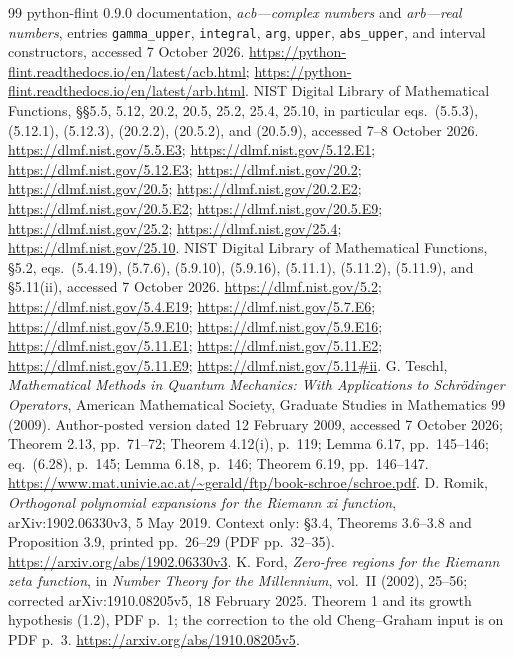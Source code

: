 \documentclass[11pt]{article}
\theoremstyle{remark}\newtheorem{remark}[theorem]{Remark}
\begin{document}
\begin{thebibliography}{99}
 python-flint 0.9.0 documentation,
\emph{acb---complex numbers} and \emph{arb---real numbers},
entries \texttt{gamma\_upper}, \texttt{integral}, \texttt{arg},
\texttt{upper}, \texttt{abs\_upper}, and interval constructors,
accessed 7 October 2026.
\url{https://python-flint.readthedocs.io/en/latest/acb.html};
\url{https://python-flint.readthedocs.io/en/latest/arb.html}.
 NIST Digital Library of Mathematical Functions,
\S\S5.5, 5.12, 20.2, 20.5, 25.2, 25.4, 25.10,
in particular eqs.~(5.5.3), (5.12.1), (5.12.3), (20.2.2), (20.5.2),
and (20.5.9), accessed 7--8 October 2026.
\url{https://dlmf.nist.gov/5.5.E3};
\url{https://dlmf.nist.gov/5.12.E1};
\url{https://dlmf.nist.gov/5.12.E3};
\url{https://dlmf.nist.gov/20.2}; \url{https://dlmf.nist.gov/20.5};
\url{https://dlmf.nist.gov/20.2.E2};
\url{https://dlmf.nist.gov/20.5.E2};
\url{https://dlmf.nist.gov/20.5.E9};
\url{https://dlmf.nist.gov/25.2}; \url{https://dlmf.nist.gov/25.4};
\url{https://dlmf.nist.gov/25.10}.
 NIST Digital Library of Mathematical Functions,
\S5.2, eqs.~(5.4.19), (5.7.6), (5.9.10), (5.9.16),
(5.11.1), (5.11.2), (5.11.9),
and \S5.11(ii),
accessed 7 October 2026.
\url{https://dlmf.nist.gov/5.2};
\url{https://dlmf.nist.gov/5.4.E19};
\url{https://dlmf.nist.gov/5.7.E6};
\url{https://dlmf.nist.gov/5.9.E10};
\url{https://dlmf.nist.gov/5.9.E16};
\url{https://dlmf.nist.gov/5.11.E1};
\url{https://dlmf.nist.gov/5.11.E2};
\url{https://dlmf.nist.gov/5.11.E9}; \url{https://dlmf.nist.gov/5.11#ii}.
 G. Teschl,
\emph{Mathematical Methods in Quantum Mechanics: With Applications
to Schr\"odinger Operators}, American Mathematical Society,
Graduate Studies in Mathematics 99 (2009).
Author-posted version dated 12 February 2009, accessed 7 October 2026;
Theorem 2.13, pp.~71--72; Theorem 4.12(i), p.~119;
Lemma 6.17, pp.~145--146; eq.~(6.28), p.~145;
Lemma 6.18, p.~146; Theorem 6.19, pp.~146--147.
\url{https://www.mat.univie.ac.at/~gerald/ftp/book-schroe/schroe.pdf}.
 D. Romik,
\emph{Orthogonal polynomial expansions for the Riemann xi function},
arXiv:1902.06330v3, 5 May 2019.
Context only: \S3.4, Theorems 3.6--3.8 and Proposition 3.9,
printed pp.~26--29 (PDF pp.~32--35).
\url{https://arxiv.org/abs/1902.06330v3}.
 K. Ford, \emph{Zero-free regions for the Riemann zeta
function}, in \emph{Number Theory for the Millennium}, vol.~II
(2002), 25--56; corrected arXiv:1910.08205v5, 18 February 2025.
Theorem 1 and its growth hypothesis (1.2), PDF p.~1;
the correction to the old Cheng--Graham input is on PDF p.~3.
\url{https://arxiv.org/abs/1910.08205v5}.

\end{thebibliography}
\end{document}
